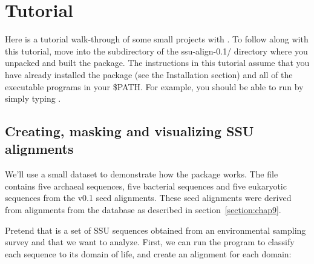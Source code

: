 \section{Tutorial}
\label{section:tutorial}

Here is a tutorial walk-through of some small projects with
. To follow along with this tutorial, move into the
 subdirectory of the {ssu-align-0.1/} directory where
you unpacked and built the package.
The instructions in this tutorial assume that you have already
installed the package (see the Installation section)
and all of the  executable programs
in your \$PATH. For example, you should be able to run
 by simply typing .

\begin{comment}
\subsection{Files used in this tutorial}

In the first section of this tutorial we'll use the following files in
the \prog{tutorial} directory:

  \begin{sreitems}{}
  \item[\prog{seed-15.fa}] a sequence file containing
    fifteen SSU rRNA sequences, created specifically for use in this
    tutorial. These are full or partial sequences from the archaeal,
    bacterial and eukaryotic default \sft{crw} seed alignments used to
    build the default \software{ssu-align} models.
  \end{sreitems}
\end{comment}

\subsection{Creating, masking and visualizing SSU alignments}

We'll use a small dataset to demonstrate how the package works.
The file  contains five archaeal sequences, five
bacterial sequences and five eukaryotic sequences from the
 v0.1 seed alignments. These seed alignments
were derived from alignments from the  database
\cite{CannoneGutell02} as described in section~\ref{section:chap9}.

Pretend that  is a set of SSU sequences obtained from
an environmental sampling survey and that we want to analyze. First,
we can run the  program to classify each sequence to
its domain of life, and create an alignment for each domain:

